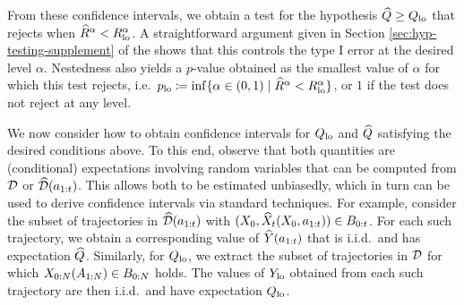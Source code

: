 From these confidence intervals, we obtain a test for the hypothesis $\widehat{Q} \geq Q_{\mathrm{lo}}$ that rejects when $\widehat{R}^{\alpha} < R_{\mathrm{lo}}^{\alpha}$.
A straightforward argument given in Section \ref{sec:hyp-testing-supplement} of the \AppendixName shows that this controls the type I error at the desired level $\alpha$.
Nestedness also yields a $p$-value obtained as the smallest value of $\alpha$ for which this test rejects, i.e.\
$p_{\textup{lo}} \coloneqq \inf\{\alpha \in (0, 1) \mid \text{$\widehat{R}^{\alpha} < R_{\mathrm{lo}}^{\alpha}$}\}$,
or $1$ if the test does not reject at any level.

We now consider how to obtain confidence intervals for $Q_{\mathrm{lo}}$ and $\widehat{Q}$ satisfying the desired conditions above.
To this end, observe that both quantities are (conditional) expectations involving random variables that can be computed from $\mathcal{D}$ or $\widehat{\mathcal{D}}(a_{1:t})$.
This allows both to be estimated unbiasedly, which in turn can be used to derive confidence intervals via standard techniques.
For example, consider the subset of trajectories in $\widehat{\mathcal{D}}(a_{1:t})$ with $(X_0, \widehat{X}_{t}(X_0, a_{1:t})) \in B_{0:t}$.
For each such trajectory, we obtain a corresponding value of $\widehat{Y}(a_{1:t})$ that is i.i.d.\ and has expectation $\widehat{Q}$.
Similarly, for $Q_{\mathrm{lo}}$, we extract the subset of trajectories in $\mathcal{D}$ for which $X_{0:N}(A_{1:N}) \in B_{0:N}$ holds. %
The values of $Y_{\mathrm{lo}}$ obtained from each such trajectory are then i.i.d.\ and have expectation $Q_{\mathrm{lo}}$.

